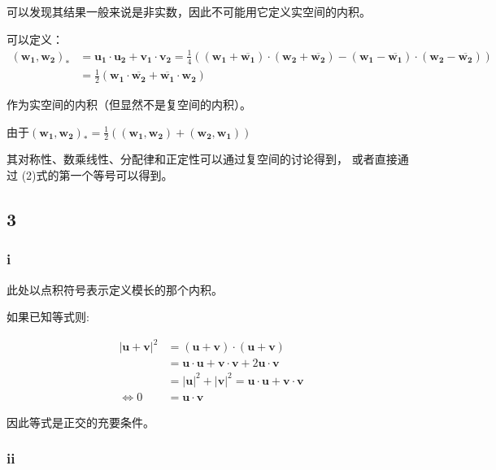 \documentclass[UTF8,c5size]{ctexart}
\begin{document}
可以发现其结果一般来说是非实数，因此不可能用它定义实空间的内积。


\newcommand{\cbm}[1]{\overline{\bm{#1}}}
可以定义：
\begin{equation}
    \begin{split}
        (\bm{w_1},\bm{w_2})_*&=
\bm{u_1}\cdot\bm{u_2}
+\bm{v_1}\cdot\bm{v_2}
=\frac{1}{4}\left((\bm{w_1}+\cbm{w_1})\cdot(\bm{w_2}+\cbm{w_2})
-(\bm{w_1}-\cbm{w_1})\cdot(\bm{w_2}-\cbm{w_2})\right)\\
&=\frac{1}{2}\left(\bm{w_1}\cdot\cbm{w_2}+\cbm{w_1}\cdot\bm{w_2}\right)
    \end{split}
\end{equation}


作为实空间的内积（但显然不是复空间的内积）。

由于$(\bm{w_1},\bm{w_2})_*=\frac{1}{2}((\bm{w_1},\bm{w_2})+(\bm{w_2},\bm{w_1}))$

其对称性、数乘线性、分配律和正定性可以通过复空间的讨论得到，
或者直接通过 (2)式的第一个等号可以得到。


\subsection*{3}

\subsubsection*{i}

此处以点积符号表示定义模长的那个内积。

如果已知等式则:

\begin{equation*}
    \begin{split}
        |\bm{u}+\bm{v}|^2&=(\bm{u}+\bm{v})\cdot (\bm{u}+\bm{v})\\
        &=\bm{u}\cdot\bm{u}+\bm{v}\cdot\bm{v}+2\bm{u}\cdot\bm{v}\\
        &=|\bm{u}|^2+|\bm{v}|^2=\bm{u}\cdot\bm{u}+\bm{v}\cdot\bm{v}\\
        \Leftrightarrow 0&=\bm{u}\cdot\bm{v}
    \end{split}
\end{equation*}

因此等式是正交的充要条件。  

\subsubsection*{ii}
\end{document}
